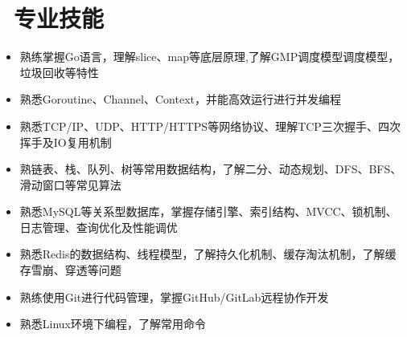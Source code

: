 \documentclass{resume}
\begin{document}
    











\section{\faCogs\ 专业技能}
\begin{onehalfspacing}
\begin{itemize}

    \item 熟练掌握Go语言，理解slice、map等底层原理,了解GMP调度模型调度模型，垃圾回收等特性
    \item 熟悉Goroutine、Channel、Context，并能高效运行进行并发编程
    \item 熟悉TCP/IP、UDP、HTTP/HTTPS等网络协议、理解TCP三次握手、四次挥手及IO复用机制
    \item 熟链表、栈、队列、树等常用数据结构，了解二分、动态规划、DFS、BFS、滑动窗口等常见算法
    \item 熟悉MySQL等关系型数据库，掌握存储引擎、索引结构、MVCC、锁机制、日志管理、查询优化及性能调优
    \item 熟悉Redis的数据结构、线程模型，了解持久化机制、缓存淘汰机制，了解缓存雪崩、穿透等问题
    \item 熟练使用Git进行代码管理，掌握GitHub/GitLab远程协作开发
    \item 熟悉Linux环境下编程，了解常用命令

\end{itemize}
\end{onehalfspacing}
\end{document}
